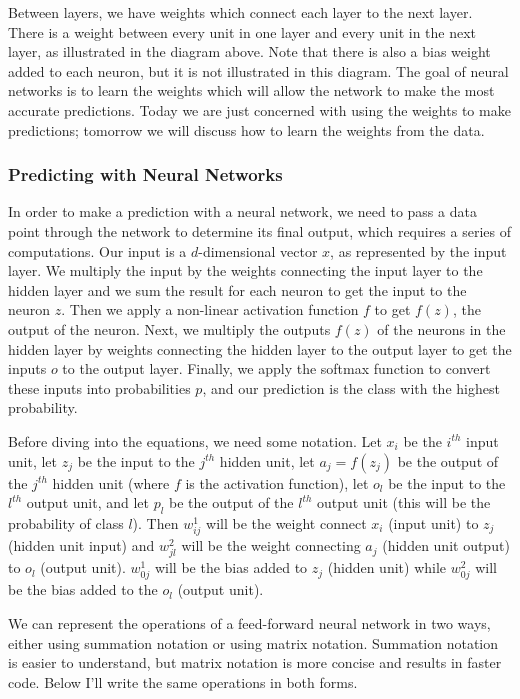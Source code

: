 \documentclass{article}
\begin{document}
Between layers, we have weights which connect each layer to the next layer. There is a weight between every unit in one layer and every unit in the next layer, as illustrated in the diagram above. Note that there is also a bias weight added to each neuron, but it is not illustrated in this diagram. The goal of neural networks is to learn the weights which will allow the network to make the most accurate predictions. Today we are just concerned with using the weights to make predictions; tomorrow we will discuss how to learn the weights from the data.

\subsubsection{Predicting with Neural Networks} \label{predicting}

In order to make a prediction with a neural network, we need to pass a data point through the network to determine its final output, which requires a series of computations. Our input is a $d$-dimensional vector $x$, as represented by the input layer. We multiply the input by the weights connecting the input layer to the hidden layer and we sum the result for each neuron to get the input to the neuron $z$. Then we apply a non-linear activation function $f$ to get $f(z)$, the output of the neuron. Next, we multiply the outputs $f(z)$ of the neurons in the hidden layer by weights connecting the hidden layer to the output layer to get the inputs $o$ to the output layer. Finally, we apply the softmax function to convert these inputs into probabilities $p$, and our prediction is the class with the highest probability.

Before diving into the equations, we need some notation. Let $x_i$ be the $i^{th}$ input unit, let $z_j$ be the input to the $j^{th}$ hidden unit, let $a_j = f(z_j)$ be the output of the $j^{th}$ hidden unit (where $f$ is the activation function), let $o_l$ be the input to the $l^{th}$ output unit, and let $p_l$ be the output of the $l^{th}$ output unit (this will be the probability of class $l$). Then $w_{ij}^1$ will be the weight connect $x_i$ (input unit) to $z_j$ (hidden unit input) and $w_{jl}^2$ will be the weight connecting $a_j$ (hidden unit output) to $o_l$ (output unit). $w_{0j}^1$ will be the bias added to $z_j$ (hidden unit) while $w_{0j}^2$ will be the bias added to the $o_l$ (output unit).

We can represent the operations of a feed-forward neural network in two ways, either using summation notation or using matrix notation. Summation notation is easier to understand, but matrix notation is more concise and results in faster code. Below I'll write the same operations in both forms.
\end{document}
